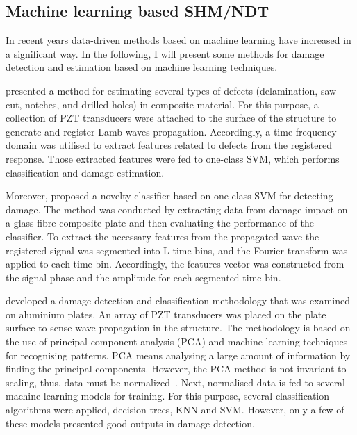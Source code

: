 \subsection{Machine learning based SHM/NDT}
In recent years data-driven methods based on machine learning have increased in a significant way. 
In the following, I will present some methods for damage detection and estimation based on machine learning techniques.

\textcite{Das2010} presented a method for estimating several types of defects (delamination, saw cut, notches, and drilled holes) in composite material. 
For this purpose, a collection of PZT transducers were attached to the surface of the structure to generate and register Lamb waves propagation. 
Accordingly, a time-frequency domain was utilised to extract features related to defects from the registered response. 
Those extracted features were fed to one-class SVM, which performs classification and damage estimation. 

Moreover, \textcite{Dib2018} proposed a novelty classifier based on one-class SVM for detecting damage. 
The method was conducted by extracting data from damage impact on a glass-fibre composite plate and then evaluating the performance of the classifier. 
To extract the necessary features from the propagated wave the registered signal was segmented into L time bins, and the Fourier transform was applied to each time bin.
Accordingly, the features vector was constructed from the signal phase and the amplitude for each segmented time bin.

\textcite{Vitola2016} developed a damage detection and classification methodology that was examined on aluminium plates.
An array of PZT transducers was placed on the plate surface to sense wave propagation in the structure.
The methodology is based on the use of principal component analysis (PCA) and machine learning techniques for recognising patterns.
PCA means analysing a large amount of information by finding the principal components.
However, the PCA method is not invariant to scaling, thus, data must be normalized~\cite{Tibaduiza2016}.
Next, normalised data is fed to several machine learning models for training.
For this purpose, several classification algorithms were applied, decision trees, KNN and SVM.
However, only a few of these models presented good outputs in damage detection.

